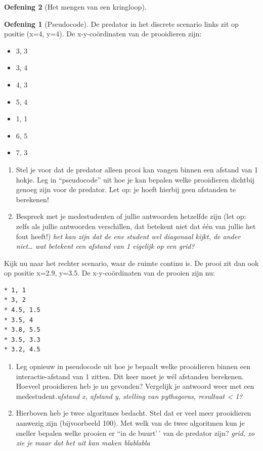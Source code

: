 \documentclass[
  a4paper,
]{scrbook}
\providecommand{\tightlist}{%
  \setlength{\itemsep}{0pt}\setlength{\parskip}{0pt}}\usepackage{longtable,booktabs,array}
\theoremstyle{definition}
\newtheorem{exercise}{Oefening}[chapter]
\theoremstyle{remark}
\begin{document}
\begin{exercise}[Het mengen van een
kringloop]
\begin{exercise}[Pseudocode]
De predator in het discrete scenario links zit op positie (x=4, y=4). De
x-y-coördinaten van de prooidieren zijn:

\begin{itemize}
\tightlist
\item
  3, 3
\item
  3, 4
\item
  4, 3
\item
  5, 4
\item
  1, 1
\item
  6, 5
\item
  7, 3
\end{itemize}

\begin{enumerate}
\def\labelenumi{\alph{enumi}.}
\tightlist
\item
  Stel je voor dat de predator alleen prooi kan vangen binnen een
  afstand van 1 hokje. Leg in ``pseudocode'' uit hoe je kan bepalen
  welke prooidieren dichtbij genoeg zijn voor de predator. Let op: je
  hoeft hierbij geen afstanden te berekenen!
\item
  Bespreek met je medestudenten of jullie antwoorden hetzelfde zijn (let
  op: zelfs als jullie antwoorden verschillen, dat betekent niet dat één
  van jullie het fout heeft!) \emph{het kan zijn dat de ene student wel
  diagonaal kijkt, de ander niet\ldots{} wat betekent een afstand van 1
  eigelijk op een grid?}
\end{enumerate}

Kijk nu naar het rechter scenario, waar de ruimte continu is. De prooi
zit dan ook op positie x=2.9, y=3.5. De x-y-coördinaten van de prooien
zijn nu:

\begin{verbatim}
* 1, 1
* 3, 2
* 4.5, 1.5
* 3.5, 4
* 3.8, 5.5
* 3.5, 3.3
* 3.2, 4.5
\end{verbatim}

\begin{enumerate}
\def\labelenumi{\alph{enumi}.}
\setcounter{enumi}{2}
\item
  Leg opnieuw in pseudocode uit hoe je bepaalt welke prooidieren binnen
  een interactie-afstand van 1 zitten. Dit keer moet je wél afstanden
  berekenen. Hoeveel prooidieren heb je nu gevonden? Vergelijk je
  antwoord weer met een medestudent.\emph{afstand x, afstand y, stelling
  van pythagoras, resultaat \textless{} 1?}
\item
  Hierboven heb je twee algoritmes bedacht. Stel dat er veel meer
  prooidieren aanwezig zijn (bijvoorbeeld 100). Met welk van de twee
  algoritmen kun je sneller bepalen welke prooien er ``in de buurt'\,'
  van de predator zijn? \emph{grid, zo zie je maar dat het uit kan maken
  blablabla}
\end{enumerate}


\end{exercise}
\end{exercise}
\end{document}
